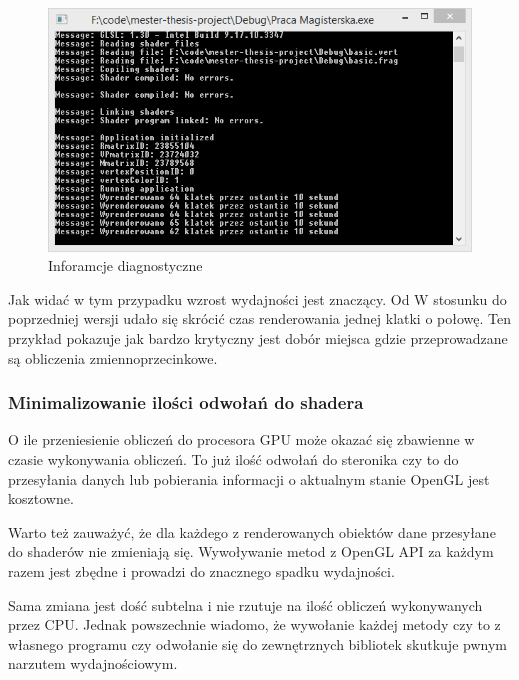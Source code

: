 \begin{figure}[h]
	\includegraphics[width=\textwidth]{images/optimized3_console}
	\caption{Inforamcje diagnostyczne}
\end{figure}

Jak widać w tym przypadku wzrost wydajności jest znaczący. Od W stosunku do poprzedniej wersji udało się skrócić czas renderowania jednej klatki o połowę. Ten przykład pokazuje jak bardzo krytyczny jest dobór miejsca gdzie przeprowadzane są obliczenia zmiennoprzecinkowe.

\subsubsection{Minimalizowanie ilości odwołań do shadera}
\thispagestyle{empty}
\par\indent

O ile przeniesienie obliczeń do procesora GPU może okazać się zbawienne w czasie wykonywania obliczeń. To już ilość odwołań do steronika czy to do przesyłania danych lub pobierania informacji o aktualnym stanie OpenGL jest kosztowne.

Warto też zauważyć, że dla każdego z renderowanych obiektów dane przesyłane do shaderów nie zmieniają się. Wywoływanie metod z OpenGL API za każdym razem jest zbędne i prowadzi do znacznego spadku wydajności.



Sama zmiana jest dość subtelna i nie rzutuje na ilość obliczeń wykonywanych przez CPU. Jednak powszechnie wiadomo, że wywołanie każdej metody czy to z własnego programu czy odwołanie się do zewnętrznych bibliotek skutkuje pwnym narzutem wydajnościowym.


